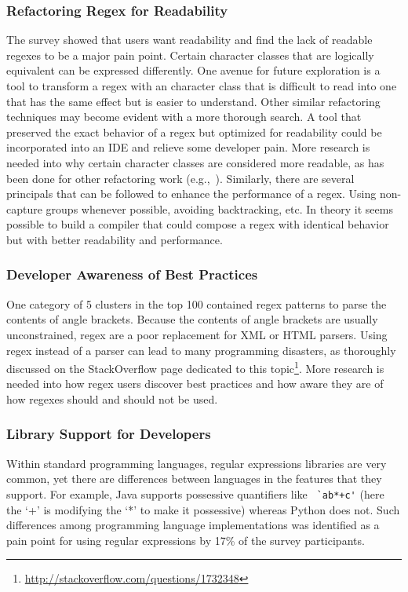 \subsubsection{Refactoring Regex for Readability}
The survey showed that users want readability and find the lack of readable regexes to be a major pain point.  Certain character classes that are logically equivalent can be expressed differently.  One avenue for future exploration is a tool to transform a regex with an character class that is difficult to read into one that has the same effect but is easier to understand.
Other similar refactoring techniques may become evident with a more thorough search.  A tool that preserved the exact behavior of a regex but optimized for readability could be incorporated into an IDE and relieve some developer pain.  More research is needed into why certain character classes are considered more readable, as has been done for other refactoring work (e.g.,~\cite{StoleeTSE2013}).
Similarly, there are several principals that can be followed to enhance the performance of a regex.  Using non-capture groups whenever possible, avoiding backtracking, etc.  In theory it seems possible to build a compiler that could compose a regex with identical behavior but with better readability and performance.

\subsubsection{Developer Awareness of Best Practices}
One category of 5 clusters in the top 100 contained regex patterns to parse the contents of angle brackets.  Because the contents of angle brackets are usually unconstrained, regex are a poor replacement for XML or HTML parsers.  Using regex instead of a parser can lead to many programming disasters, as thoroughly discussed on the StackOverflow page dedicated to this topic\footnote{\url{http://stackoverflow.com/questions/1732348}}.  More research is needed into how regex users discover best practices and how aware they are of how regexes should and should not be used.

\subsubsection{Library Support for Developers}
Within standard programming languages, regular expressions libraries are very common, yet there are  differences between languages in the features that they support. For example, Java supports possessive quantifiers like \verb! `ab*+c'! (here the `+' is modifying the `*' to make it possessive) whereas Python does not. Such differences among programming language implementations was identified as a pain point for using regular expressions by 17\% of the survey participants.  


